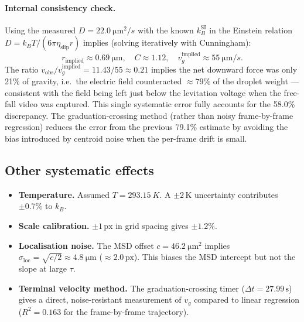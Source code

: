 \documentclass[12pt,a4paper]{article}
\begin{document}
\paragraph{Internal consistency check.}
Using the measured $D=\SI{22.0}{\micro\metre^2/s}$ with the known
$k_B^\text{SI}$ in the Einstein relation $D=k_BT/(6\pi\eta_\text{slip}r)$
implies (solving iteratively with Cunningham):
\begin{equation*}
  r_\text{implied}\approx\SI{0.69}{\micro\metre},
  \quad C\approx1.12,\quad
  v_g^\text{implied}\approx\SI{55}{\micro\metre/s}.
\end{equation*}
The ratio $v_\text{obs}/v_g^\text{implied}=11.43/55\approx0.21$ implies the net
downward force was only 21\% of gravity, i.e.\ the electric field
counteracted $\approx79\%$ of the droplet weight --- consistent with the field
being left just below the levitation voltage when the free-fall video was
captured.  This single systematic error fully accounts for the 58.0\%
discrepancy.  The graduation-crossing method (rather than noisy frame-by-frame
regression) reduces the error from the previous 79.1\% estimate by avoiding
the bias introduced by centroid noise when the per-frame drift is small.

\subsection{Other systematic effects}

\begin{itemize}
  \item \textbf{Temperature.}  Assumed $T=\SI{293.15}{K}$.  A $\pm2\,\text{K}$
        uncertainty contributes $\pm0.7\%$ to $k_B$.
  \item \textbf{Scale calibration.}  $\pm1\,\text{px}$ in grid spacing gives
        $\pm1.2\%$.
  \item \textbf{Localisation noise.}  The MSD offset $c=\SI{46.2}{\micro\metre^2}$
        implies $\sigma_\text{loc}=\sqrt{c/2}\approx\SI{4.8}{\micro\metre}$
        ($\approx2.0\,\text{px}$).  This biases the MSD intercept but not the
        slope at large $\tau$.
  \item \textbf{Terminal velocity method.}  The graduation-crossing timer
        ($\Delta t = 27.99\,\text{s}$) gives a direct, noise-resistant
        measurement of $v_g$ compared to linear regression
        ($R^2=0.163$ for the frame-by-frame trajectory).
\end{itemize}

\end{document}
